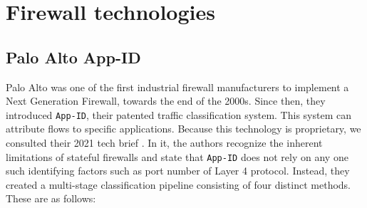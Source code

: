 \section{Firewall technologies}
\label{background:firewall}

\subsection{Palo Alto App-ID}

Palo Alto was one of the first industrial firewall manufacturers to implement a
Next Generation Firewall, towards the end of the 2000s. Since then, they
introduced \texttt{App-ID}, their patented traffic classification system. This
system can attribute flows to specific applications. Because this technology is
proprietary, we consulted their 2021 tech brief \cite{paloalto2021appid}. In it,
the authors recognize the inherent limitations of stateful firewalls and state
that \texttt{App-ID} does not rely on any one such identifying factors such as
port number of Layer 4 protocol. Instead, they created a multi-stage
classification pipeline consisting of four distinct methods. These are as follows:

